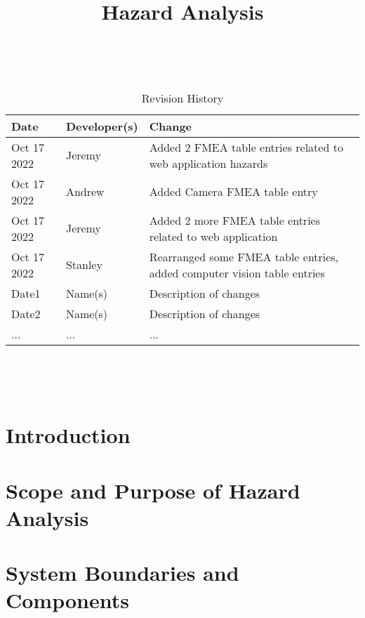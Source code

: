 \documentclass{article}
\title{Hazard Analysis\\\progname}
\author{\authname}
\date{}
\begin{document}
\maketitle
\thispagestyle{empty}

~\newpage


\begin{table}[hp]
\caption{Revision History} \label{TblRevisionHistory}
\begin{tabularx}{\textwidth}{llX}
\toprule
\textbf{Date} & \textbf{Developer(s)} & \textbf{Change}\\
\midrule
Oct 17 2022 & Jeremy & Added 2 FMEA table entries related to web application hazards\\
Oct 17 2022 & Andrew & Added Camera FMEA table entry\\
Oct 17 2022 & Jeremy & Added 2 more FMEA table entries related to web application\\
Oct 17 2022 & Stanley & Rearranged some FMEA table entries, added computer vision table entries\\
Date1 & Name(s) & Description of changes\\
Date2 & Name(s) & Description of changes\\
... & ... & ...\\
\bottomrule
\end{tabularx}
\end{table}

~\newpage

\tableofcontents

~\newpage



\section{Introduction}


\section{Scope and Purpose of Hazard Analysis}

\section{System Boundaries and Components}
\end{document}
